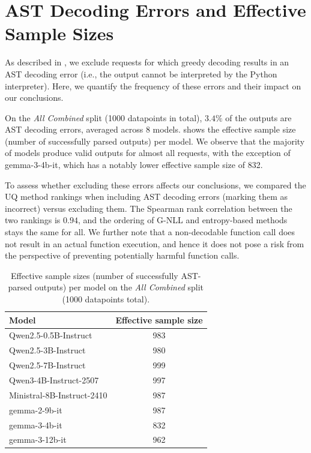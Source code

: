 \section{AST Decoding Errors and Effective Sample Sizes}
\label{app:ast_errors}

As described in , we exclude requests for which greedy decoding results in an AST decoding error (i.e., the output cannot be interpreted by the Python interpreter). Here, we quantify the frequency of these errors and their impact on our conclusions.

On the \emph{All Combined} split (1000 datapoints in total), $3.4\%$ of the outputs are AST decoding errors, averaged across 8 models.
 shows the effective sample size (number of successfully parsed outputs) per model.
We observe that the majority of models produce valid outputs for almost all requests, with the exception of gemma-3-4b-it, which has a notably lower effective sample size of 832.

To assess whether excluding these errors affects our conclusions, we compared the UQ method rankings when including AST decoding errors (marking them as incorrect) versus excluding them. The Spearman rank correlation between the two rankings is $0.94$, and the ordering of G-NLL and entropy-based methods stays the same for all.
We further note that a non-decodable function call does not result in an actual function execution, and hence it does not pose a risk from the perspective of preventing potentially harmful function calls.

\begin{table}[h!]
\centering
\caption{Effective sample sizes (number of successfully AST-parsed outputs) per model on the \emph{All Combined} split (1000 datapoints total).}
\label{tab:effective_sample_sizes}
\begin{tabular}{lc}
\toprule
\textbf{Model} & \textbf{Effective sample size} \\
\midrule
Qwen2.5-0.5B-Instruct & 983 \\
Qwen2.5-3B-Instruct & 980 \\
Qwen2.5-7B-Instruct & 999 \\
Qwen3-4B-Instruct-2507 & 997 \\
Ministral-8B-Instruct-2410 & 987 \\
gemma-2-9b-it & 987 \\
gemma-3-4b-it & 832 \\
gemma-3-12b-it & 962 \\
\bottomrule
\end{tabular}
\end{table}
